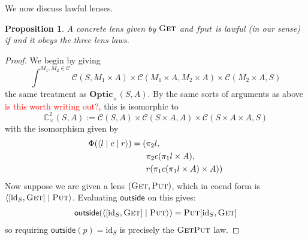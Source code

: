 \documentclass[11pt,a4paper]{article}
\theoremstyle{plain}
\newtheorem{proposition}[theorem]{Proposition}
\theoremstyle{definition}
\newcommand{\C}{\mathscr{C}}
\newcommand{\Optic}{\mathbf{Optic}}
\newcommand{\conctwice}{\mathbb{C}^2}
\newcommand{\id}{\mathrm{id}}
\newcommand{\rep}[2]{{\ensuremath \left\langle #1 \mid #2 \right\rangle}}
\newcommand{\repthree}[3]{{\ensuremath \langle #1 \mid #2 \mid #3 \rangle}}
\newcommand{\fget}{\textsc{Get}}
\newcommand{\fput}{\textsc{Put}}
\newcommand{\outside}{\mathsf{outside}}
\newcommand{\todo}[1]{\textcolor{red}{\small #1}}
\begin{document}
We now discuss lawful lenses.

\begin{proposition}\label{prop-OpticImpliesLensLaws}
  A concrete lens given by $\fget$ and $fput$ is lawful (in our sense) if and it obeys the three lens laws.
\end{proposition}
\begin{proof}
  We begin by giving
  \[ \int^{M_1, M_2 \in \C} \C(S, M_1 \times A) \times \C(M_1 \times A, M_2 \times A) \times \C(M_2 \times A, S)\]
  the same treatment as $\Optic_\times(S, A)$. By the same sorts of arguments as above \todo{is this worth writing out?}, this is isomorphic to
  \[\conctwice_\times(S, A) := \C(S, A) \times \C(S \times A, A) \times \C(S \times A \times A, S)\]
  with the isomorphism given by
  \begin{align*}
    \Phi(\repthree{l}{c}{r }) = (&\pi_2 l, \\
                                   &\pi_2 c (\pi_1 l \times A), \\
                                   &r(\pi_1 c (\pi_1 l \times A) \times A))
  \end{align*}
  Now suppose we are given a lens $(\fget, \fput)$, which in coend form is $\rep{[\id_S, \fget]}{\fput}$. Evaluating $\outside$ on this gives:
  \begin{align*}
    \outside(\rep{[\id_S, \fget]}{\fput}) = \fput [\id_S, \fget]
  \end{align*}
  so requiring $\outside(p) = \id_S$ is precisely the $\fget\fput$ law.


\end{proof}
\end{document}
